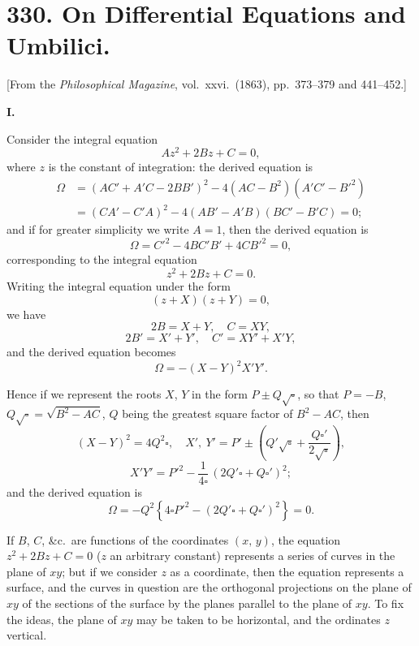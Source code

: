 \documentclass[11pt,a4paper]{article}
\theoremstyle{plain}
\begin{document}
\newpage
\section*{330. On Differential Equations and Umbilici.}

[From the \textit{Philosophical Magazine}, vol.\ xxvi.\ (1863), pp.\ 373--379 and 441--452.]

\medskip

\begin{center}\textbf{I.}\end{center}

Consider the integral equation
\[
A z^2 + 2 B z + C = 0,
\]
where $z$ is the constant of integration: the derived equation is
\begin{align*}
\Omega &= (AC' + A'C - 2BB')^2 - 4(AC - B^2)(A'C' - B'^2) \\
       &= (CA' - C'A)^2 - 4(AB' - A'B)(BC' - B'C) = 0;
\end{align*}
and if for greater simplicity we write $A = 1$, then the derived equation is
\[
\Omega = C'^2 - 4 B C' B' + 4 C B'^2 = 0,
\]
corresponding to the integral equation
\[
z^2 + 2 B z + C = 0.
\]
Writing the integral equation under the form
\[
(z + X)(z + Y) = 0,
\]
we have
\[
2 B = X + Y,\quad C = X Y,
\]
\[
2 B' = X' + Y',\quad C' = X Y' + X' Y,
\]
and the derived equation becomes
\[
\Omega = -(X - Y)^2 X' Y'.
\]

\newpage
Hence if we represent the roots $X$, $Y$ in the form $P \pm Q\sqrt{\square}$, so that $P = -B$, $Q\sqrt{\square} = \sqrt{B^2 - AC}$, $Q$ being the greatest square factor of $B^2 - AC$, then
\[
(X - Y)^2 = 4 Q^2 \square,\quad X',\ Y' = P' \pm\!\left(Q'\sqrt{\square} + \frac{Q\square'}{2\sqrt{\square}}\right),
\]
\[
X' Y' = P'^2 - \frac{1}{4\square}\,(2 Q' \square + Q \square')^2;
\]
and the derived equation is
\[
\Omega = -Q^2\!\left\{4 \square P'^2 - (2 Q'\square + Q\square')^2\right\} = 0.
\]

If $B$, $C$, \&c.\ are functions of the coordinates $(x,\,y)$, the equation $z^2 + 2 B z + C = 0$ ($z$ an arbitrary constant) represents a series of curves in the plane of $xy$; but if we consider $z$ as a coordinate, then the equation represents a surface, and the curves in question are the orthogonal projections on the plane of $xy$ of the sections of the surface by the planes parallel to the plane of $xy$. To fix the ideas, the plane of $xy$ may be taken to be horizontal, and the ordinates $z$ vertical.
\end{document}
